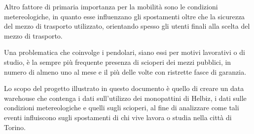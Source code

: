 Altro fattore di primaria importanza per la mobilità sono le condizioni metereologiche,
in quanto esse influenzano gli spostamenti oltre che la sicurezza del mezzo di
trasporto utilizzato, orientando spesso gli utenti finali alla scelta del mezzo di
trasporto. 

Una problematica che coinvolge i pendolari, siano essi per motivi lavorativi o di
studio, è la sempre più frequente presenza di scioperi dei mezzi pubblici, in numero
di almeno uno al mese e il più delle volte con ristrette fasce di garanzia.

Lo scopo del progetto illustrato in questo documento è quello di creare un data
warehouse che contenga i dati sull'utilizzo dei monopattini di Helbiz, i dati sulle
condizioni metereologiche e quelli sugli scioperi, al fine di analizzare come tali
eventi influiscono sugli spostamenti di chi vive lavora o studia nella città di Torino.
